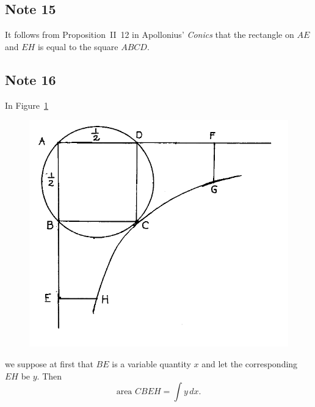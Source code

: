 \documentclass[polutonikogreek,english,twoside,openright]{article}
\begin{document}
\subsection*{Note 15}
\label{ctp15}

It follows from Proposition~II~12 in Apollonius' {\em Conics} that the
rectangle on $AE$ and $EH$ is equal to the square $ABCD$.

\subsection*{Note 16}
\label{ctp16}

In Figure~\ref{harmony2}
\begin{figure}[htp]
  \begin{center}
    \includegraphics[width=.75\textwidth]{fig/Figure64}
    \caption{}
    \label{harmony2}
    \vspace{-10pt}
  \end{center}
\end{figure}
we suppose at first that $BE$ is a variable quantity $x$ and let the
corresponding $EH$ be $y$.  Then
$$\mbox{area }CBEH = \int\! y\,dx.$$
\end{document}
